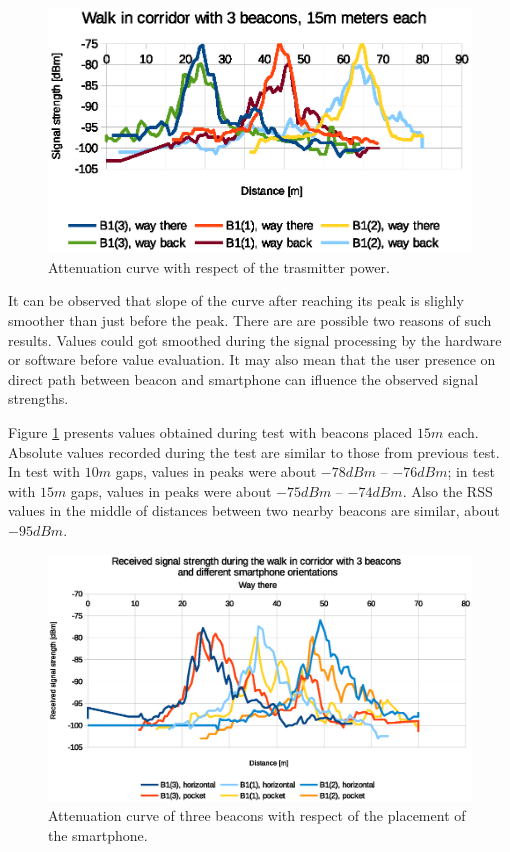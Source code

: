 \documentclass[../main.tex]{subfiles}
\begin{document}
\begin{figure}[!htbp]
\includegraphics[width=\textwidth, keepaspectratio]{pictures/tests_case10_walk_15m_raw}
\centering
\caption{Attenuation curve with respect of the trasmitter power.}
\label{fig:tests_case10_walk_15m_raw}
\end{figure}

It can be observed that slope of the curve after reaching its peak is slighly smoother than just before the peak. There are are possible two reasons of such results. Values could got smoothed during the signal processing by the hardware or software before value evaluation. It may also mean that the user presence on direct path between beacon and smartphone can ifluence the observed signal strengths.

Figure \ref{fig:tests_case10_walk_15m_raw} presents values obtained during test with beacons placed $15m$ each. Absolute values recorded during the test are similar to those from previous test. In test with $10m$ gaps, values in peaks were about $-78dBm$ -- $-76dBm$; in test with $15m$ gaps, values in peaks were about $-75dBm$ -- $-74dBm$. Also the RSS values in the middle of distances between two nearby beacons are similar, about $-95dBm$.

\begin{figure}[!htbp]
\includegraphics[width=\textwidth, keepaspectratio]{pictures/tests_case11_walk_10m_smartphone_orientation}
\centering
\caption{Attenuation curve of three beacons with respect of the placement of the smartphone.}
\label{fig:tests_case11_walk_10m_smartphone_orientation}
\end{figure}
\end{document}
